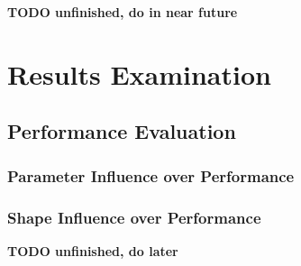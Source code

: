 \documentclass[12pt, oneside]{report}
\begin{document}
{\bf TODO unfinished, do in near future}


\chapter{Results Examination}
\section{Performance Evaluation}
\subsection{Parameter Influence over Performance}
\subsection{Shape Influence over Performance}
{\bf TODO unfinished, do later}


\newpage
\printbibliography
\end{document}
